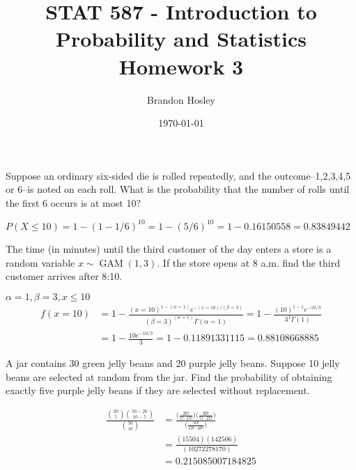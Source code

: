 \documentclass[answers]{exam}
\title{STAT 587 - Introduction to Probability and Statistics%
	\\ Homework 3}
\author{Brandon Hosley}
\date{\today}
\begin{document}
\maketitle
\begin{questions}

\question 
Suppose an ordinary six-sided die is rolled repeatedly, and the outcome--1,2,3,4,5 or 6--is noted on each roll. What is the probability that the number of rolls until the first 6 occurs is at most 10?
\begin{solution}
	\(P(X\leq10) = 1-(1-1/6)^10 = 1-(5/6)^10 = 1-0.16150558 = 0.83849442\)
\end{solution}

\question 
The time (in minutes) until the third customer of the day enters a store is a random variable \(x \sim \operatorname{GAM}(1,3)\). If the store opens at 8 a.m. find the third customer arrives after 8:10.
\begin{solution}
	\(\alpha=1, \beta=3, x \leq 10\)
	\begin{align*}
	f(x=10) 
	&= 1-\frac{(x=10)^{1-(\alpha=1)}e^{-(x=10)/(\beta=3)}}{(\beta=3)^{(\alpha=1)}\Gamma(\alpha=1)}
	= 1-\frac{(10)^{1-1}e^{-10/3}}{3^{1}\Gamma(1)} \\
	&= 1-\frac{10e^{-10/3}}{3} = 1-0.11891331115 = 0.88108668885
	\end{align*}
\end{solution}

\question 
A jar contains 30 green jelly beans and 20 purple jelly beans. Suppose 10 jelly beans are selected at random from the jar. Find the probability of obtaining exactly five purple jelly beans if they are selected without replacement.
\begin{solution}
	\begin{align*}
		\frac{\binom{20}{5}\binom{50-20}{10-5}}{\binom{50}{10}}
		&= \frac{\bigg(\frac{20!}{5!\cdot15!}\bigg)\bigg(\frac{30!}{5!\cdot25!}\bigg)}%
				{\bigg(\frac{50!}{10!\cdot40!}\bigg)} \\
		&= \frac{(15504)(142506)}{(10272278170)} \\
		&= 0.215085007184825
	\end{align*}
\end{solution}


\end{questions}
\end{document}
